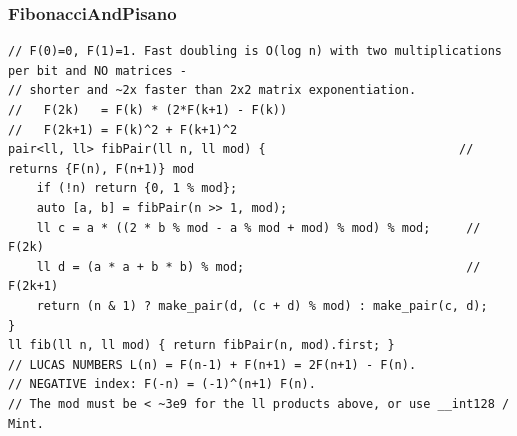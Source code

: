 \documentclass[9pt,a4paper,twocolumn]{extarticle}
\begin{document}
\subsubsection{FibonacciAndPisano}
\nopagebreak
\begin{lstlisting}
// F(0)=0, F(1)=1. Fast doubling is O(log n) with two multiplications per bit and NO matrices -
// shorter and ~2x faster than 2x2 matrix exponentiation.
//   F(2k)   = F(k) * (2*F(k+1) - F(k))
//   F(2k+1) = F(k)^2 + F(k+1)^2
pair<ll, ll> fibPair(ll n, ll mod) {                           // returns {F(n), F(n+1)} mod
    if (!n) return {0, 1 % mod};
    auto [a, b] = fibPair(n >> 1, mod);
    ll c = a * ((2 * b % mod - a % mod + mod) % mod) % mod;     // F(2k)
    ll d = (a * a + b * b) % mod;                               // F(2k+1)
    return (n & 1) ? make_pair(d, (c + d) % mod) : make_pair(c, d);
}
ll fib(ll n, ll mod) { return fibPair(n, mod).first; }
// LUCAS NUMBERS L(n) = F(n-1) + F(n+1) = 2F(n+1) - F(n).
// NEGATIVE index: F(-n) = (-1)^(n+1) F(n).
// The mod must be < ~3e9 for the ll products above, or use __int128 / Mint.


\end{lstlisting}
\end{document}
